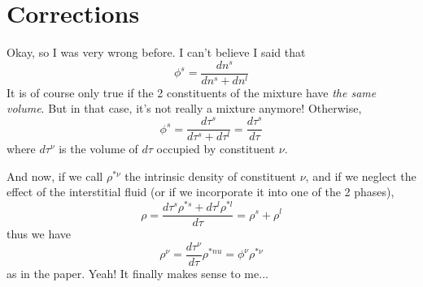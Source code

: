 \documentclass[11pt]{article}
\begin{document}
\section{Corrections}

Okay, so I was very wrong before. I can't believe I said that
\[
\phi^s = \frac{dn^s}{dn^s + dn^l}
\]
It is of course only true if the 2 constituents of the mixture have \textit{the same volume}.  But in that case, it's not really a mixture anymore!
Otherwise,
\[
\phi^s = \frac{d\tau^s}{d\tau^s + d\tau^l} = \frac{d\tau^s}{d\tau}
\]
where $d\tau^\nu$ is the volume of $d\tau$ occupied by constituent $\nu$. 

And now, if we call $\rho^{*\nu}$ the intrinsic density of constituent $\nu$, and if we neglect the effect of the interstitial fluid (or if we incorporate it into one of the 2 phases),
\[
\rho = \frac{d\tau^s \rho^{*s} + d\tau^l \rho^{*l}}{d\tau} = \rho^s + \rho^l
\]
thus we have 
\[
\rho^\nu = \frac{d\tau^\nu}{d\tau} \rho^{*nu} = \phi^\nu \rho^{*\nu}
\]
as in the paper. Yeah! It finally makes sense to me...
\end{document}
